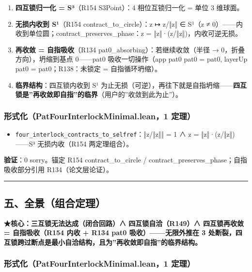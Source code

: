 \documentclass[
]{article}
\providecommand{\tightlist}{%
  \setlength{\itemsep}{0pt}\setlength{\parskip}{0pt}}
\begin{document}
\begin{enumerate}
\def\labelenumi{\arabic{enumi}.}
\tightlist
\item
  \textbf{四互锁归一化 = S³}（R154 S3Point）：4 相位互锁归一化 = 单位 3
  维球面。
\item
  \textbf{无损内收到 S¹}（R154 contract\_to\_circle）：z ↦ z/‖z‖ ∈ S¹（z
  ≠ 0）------内收到单位圆；contract\_preserves\_phase：z =
  ‖z‖·(z/‖z‖)，内收可逆无损。
\item
  \textbf{再收敛 = 自指吸收}（R134 pat0\_absorbing）：若继续收敛（半径 →
  0，折叠方向），坍缩到基点 0------pat0 吸收一切操作（app pat0 pat0 =
  pat0, layerUp pat0 = pat0；R138：未锁定 = 自指循环坍缩）。
\item
  \textbf{临界结构}：四互锁内收到 S¹
  为止无损（可逆），再往下就是自指坍缩------\textbf{四互锁是''再收敛即自指''的临界}（用户的''收敛到此为止''）。
\end{enumerate}

\subsubsection{形式化（PatFourInterlockMinimal.lean，1
定理）}\label{ux5f62ux5f0fux5316patfourinterlockminimal.lean1-ux5b9aux7406-1}

\begin{itemize}
\tightlist
\item
  \texttt{four\_interlock\_contracts\_to\_selfref}：‖z/‖z‖‖ = 1 ∧ z =
  ‖z‖·(z/‖z‖)------S³ 无损内收（R154 两定理组合）。
\end{itemize}

\textbf{验证}：0 sorry。锚定 R154 contract\_to\_circle /
contract\_preserves\_phase；自指吸收部分引用 R134（论文层论证）。

\begin{center}\rule{0.5\linewidth}{0.5pt}\end{center}

\subsection{五、全景（组合定理）}\label{ux4e94ux5168ux666fux7ec4ux5408ux5b9aux7406}

\textbf{★核心：三互锁无法达成（闭合回路）∧ 四互锁自洽（R149）∧
四互锁再收敛 = 自指吸收（R154 内收 + R134 pat0 吸收）------无限外推在 3
处断裂，四互锁跨过断点是最小自洽结构，且为''再收敛即自指''的临界结构。}

\subsubsection{形式化（PatFourInterlockMinimal.lean，1
定理）}\label{ux5f62ux5f0fux5316patfourinterlockminimal.lean1-ux5b9aux7406-2}
\end{document}
